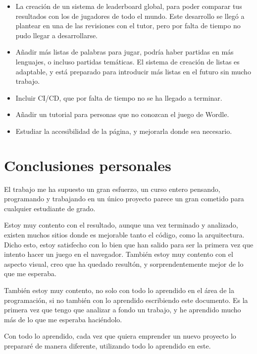 \begin{itemize}
	\item La creación de un sistema de leaderboard global, para poder comparar tus resultados con los de jugadores de todo el mundo. Este desarrollo se llegó a plantear en una de las revisiones con el tutor, pero por falta de tiempo no pudo llegar a desarrollarse.
	\item Añadir más listas de palabras para jugar, podría haber partidas en más lenguajes, o incluso partidas temáticas. El sistema de creación de listas es adaptable, y está preparado para introducir más listas en el futuro sin mucho trabajo.
	\item Incluir CI/CD, que por falta de tiempo no se ha llegado a terminar.
	\item Añadir un tutorial para personas que no conozcan el juego de Wordle.
	\item Estudiar la accesibilidad de la página, y mejorarla donde sea necesario.
\end{itemize}


\section{Conclusiones personales}
El trabajo me ha supuesto un gran esfuerzo, un curso entero pensando, programando y trabajando en un único proyecto parece un gran cometido para cualquier estudiante de grado.

Estoy muy contento con el resultado, aunque una vez terminado y analizado, existen muchos sitios donde es mejorable tanto el código, como la arquitectura. Dicho esto, estoy satisfecho con lo bien que han salido para ser la primera vez que intento hacer un juego en el navegador. También estoy muy contento con el aspecto visual, creo que ha quedado resultón, y sorprendentemente mejor de lo que me esperaba.

También estoy muy contento, no solo con todo lo aprendido en el área de la programación, si no también con lo aprendido escribiendo este documento. Es la primera vez que tengo que analizar a fondo un trabajo, y he aprendido mucho más de lo que me esperaba haciéndolo.

Con todo lo aprendido, cada vez que quiera emprender un nuevo proyecto lo prepararé de manera diferente, utilizando todo lo aprendido en este.
